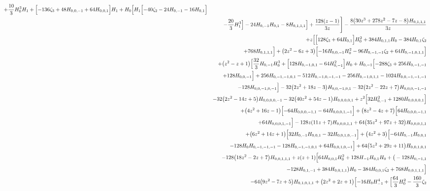 \begin{eqnarray}
+\frac{10}{3} H_0^3 H_1+\Bigl[-136 \zeta_3+48 H_{0,0,-1}+64H_{0,0,1}\Bigr] H_1+H_0 \Bigl[H_1 \Bigl[-40 \zeta_2-24 H_{0,-1}-16H_{0,1}\Bigr]
\nonumber \\ &&
-\frac{20}{3} H_1^3\Bigr]-24 H_{0,-1} H_{0,1}-8H_{0,1,1,1}\Bigr]+\frac{128  (z-1)}{3 z}\Biggr]
-\frac{8 \big(30 z^3+278  z^2-7 z-8\big) H_{0,1,1,1}}{3 z}
\nonumber \\ &&
+z \Bigl[\Bigl[128  \zeta_3+64 H_{0,1}\Bigr] H_0^2+384  H_{0,1,1} H_0-384  H_{0,1}\zeta_2
\nonumber \\ &&
+768  H_{0,1,1,1}\Bigr]+\big(2 z^2-6 z+3\big) \Bigl[-16H_{0,0,-1} H_0^2-96 H_{0,-1,-1} \zeta_2+64 H_{0,-1,0,1,1}\Bigr]
\nonumber \\ &&
+\big(z^2-z+1\big) \Bigl[\frac{32}{3} H_{0,-1}H_0^3+\Bigl[128  H_{0,-1,0,1}-64 H_{0,-1}^2\Bigr] H_0+H_{0,-1} \Bigl[-288 \zeta_3
+256 H_{0,-1,-1}
\nonumber \\ &&
+128 H_{0,0,-1}\Bigr]+256 H_{0,-1,-1,0,1}-512 H_{0,-1,0,-1,-1}-256 H_{0,-1,0,1,1}-1024H_{0,0,-1,-1,-1}
\nonumber \\ &&
-128 H_{0,0,-1,0,-1}\Bigr]-32 \big(2 z^2+18 z-3\big)H_{0,0,-1,0,1}-32 \big(2 z^2-22 z+7\big) H_{0,0,0,-1,-1}
\nonumber \\ &&
-32 \big(2 z^2-14z+5\big) H_{0,0,0,0,-1}-32 \big(40 z^2+54 z-1\big) H_{0,0,0,0,1}+z^2 \Bigl[32H_{0,-1}^2+1280  H_{0,0,0,0,1}\Bigr]
\nonumber \\ &&
+\big(4 z^2+16 z-1\big) \Bigl[-64H_{0,0,0,-1,1}-64 H_{0,0,0,1,-1}\Bigr]+\big(8 z^2-4 z+7\big) \Bigl[64 H_{0,0,0,-1,1}
\nonumber \\ &&
+64  H_{0,0,0,1,-1}\Bigr]-128  z (11 z+7)H_{0,0,0,1,1}+64 \big(35 z^2+97 z+32\big) H_{0,0,0,1,1}
\nonumber \\ &&
+\big(6 z^2+14 z+1\big)\Bigl[32 H_{0,-1} H_{0,0,1}-32 H_{0,0,1,0,-1}\Bigr]+\big(4 z^2+3\big) \Bigl[-64 H_{0,-1} H_{0,0,1}
\nonumber \\ &&
-128 H_0 H_{0,-1,-1,-1}-128  H_{0,-1,-1,0,1}+64 H_{0,0,1,0,-1}\Bigr]+64 \big(5 z^2+29 z+11\big) H_{0,0,1,0,1}
\nonumber \\ &&
-128\big(18 z^2-2 z+7\big) H_{0,0,1,1,1}+z (z+1) \Bigl[64  H_{0,0,1}H_0^2+128 H_{-1} H_{0,1} H_0+\big(-128 H_{0,-1,1}
\nonumber \\ &&
-128 H_{0,1,-1}+384 H_{0,0,1,1}\big) H_0-384  H_{0,0,1} \zeta_2+768 H_{0,0,1,1,1}\Bigr]
\nonumber \\ &&
-64 \big(9 z^2-7 z+5\big) H_{0,1,0,1,1}+\big(2 z^2+2z+1\big) \Bigl[-16 H_0 H_{-1}^4+\Bigl[\frac{64}{3} H_0^2-\frac{160}{3} \zeta_2
\nonumber \\ &&

\end{eqnarray}
